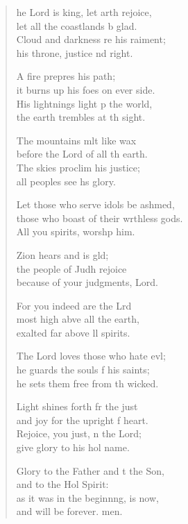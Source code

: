 \settowidth{\versewidth}{those who boast of their worthless gods. *}
\begin{verse}%
  \begin{patverse}
    he Lord is king, let arth rejoice,\Med\\
let all the coastlands b glad.\\
Cloud and darkness re his raiment;\Med\\
his throne, justice nd right.

A fire prepres his path;\Med\\
it burns up his foes on ever side.\\
His lightnings light p the world,\Med\\
the earth trembles at th sight.

The mountains mlt like wax\Med\\
before the Lord of all th earth.\\
The skies proclim his justice;\Med\\
all peoples see h\pointup{\i}s glory.

Let those who serve idols be ashmed,\Flex\\
those who boast of their wrthless gods.\Med\\
All you spirits, worsh\pointup{\i}p him.

Zion hears and is gld;\Flex\\
the people of Judh rejoice\Med\\
because of your judgments,  Lord.

For you indeed are the Lrd\Flex\\
most high abve all the earth,\Med\\
exalted far above ll spirits.

The Lord loves those who hate ev\pointup{\i}l;\Flex\\
he guards the souls f his saints;\Med\\
he sets them free from th wicked.

Light shines forth fr the just\Med\\
and joy for the upright f heart.\\
Rejoice, you just, \pointup{\i}n the Lord;\Med\\
give glory to his hol name.

Glory to the Father and t the Son,\Med\\
and to the Hol Spirit:\\
as it was in the beginn\pointup{\i}ng, is now,\Med\\
and will be forever. men.
  \end{patverse}
\end{verse}
